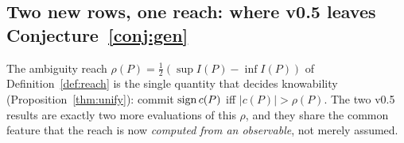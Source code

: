 
\subsection{Two new rows, one reach: where v0.5 leaves
Conjecture~\ref{conj:gen}}\label{sec:reach-unification}

The ambiguity reach $\rho(P)=\tfrac12(\sup I(P)-\inf I(P))$ of
Definition~\ref{def:reach} is the single quantity that decides knowability
(Proposition~\ref{thm:unify}): commit $\operatorname{sign} c(P)$ iff $|c(P)|>\rho(P)$. The two
v0.5 results are exactly two more evaluations of this $\rho$, and they share the
common feature that the reach is now \emph{computed from an observable},
not merely assumed.

